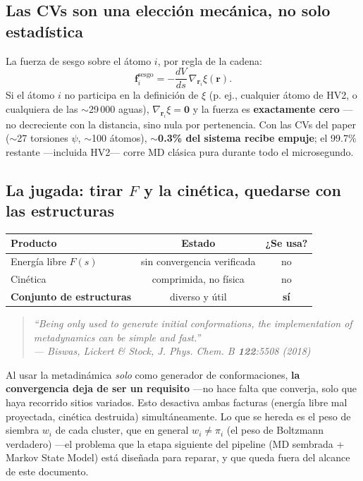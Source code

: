 \documentclass[11pt]{article}
\begin{document}
\subsection{Las CVs son una elección mecánica, no solo estadística}
La fuerza de sesgo sobre el átomo $i$, por regla de la cadena:
$$\mathbf{f}_i^{\text{sesgo}} = -\frac{dV}{ds}\,\nabla_{\mathbf{r}_i}\xi(\mathbf{r}).$$
Si el átomo $i$ no participa en la definición de $\xi$ (p. ej., cualquier átomo de HV2, o cualquiera de las $\sim$29\,000 aguas), $\nabla_{\mathbf{r}_i}\xi=\mathbf{0}$ y la fuerza es \textbf{exactamente cero} —no decreciente con la distancia, sino nula por pertenencia. Con las CVs del paper ($\sim$27 torsiones $\psi$, $\sim$100 átomos), \textbf{$\sim$0.3\% del sistema recibe empuje}; el 99.7\% restante —incluida HV2— corre MD clásica pura durante todo el microsegundo.

\subsection{La jugada: tirar $F$ y la cinética, quedarse con las estructuras}
\begin{center}
\begin{tabular}{lcc}
\toprule
Producto & Estado & ¿Se usa? \\
\midrule
Energía libre $F(s)$ & sin convergencia verificada & no \\
Cinética & comprimida, no física & no \\
\textbf{Conjunto de estructuras} & diverso y útil & \textbf{sí} \\
\bottomrule
\end{tabular}
\end{center}
\begin{quote}
\small\itshape ``Being only used to generate initial conformations, the implementation of metadynamics can be simple and fast.''\\
\upshape --- Biswas, Lickert \& Stock, \textit{J. Phys. Chem. B} \textbf{122}:5508 (2018)
\end{quote}
Al usar la metadinámica \emph{solo} como generador de conformaciones, \textbf{la convergencia deja de ser un requisito} —no hace falta que converja, solo que haya recorrido sitios variados. Esto desactiva ambas facturas (energía libre mal proyectada, cinética destruida) simultáneamente. Lo que se hereda es el peso de siembra $w_i$ de cada cluster, que en general $w_i\ne\pi_i$ (el peso de Boltzmann verdadero) —el problema que la etapa siguiente del pipeline (MD sembrada + Markov State Model) está diseñada para reparar, y que queda fuera del alcance de este documento.
\end{document}
